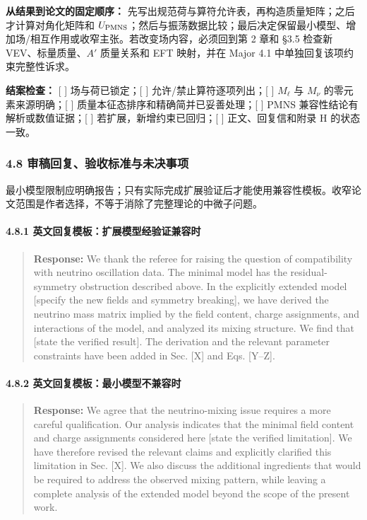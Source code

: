 \documentclass[
  chinese,
  UTF8]{ctexart}
\begin{document}
\textbf{从结果到论文的固定顺序：}
先写出规范荷与算符允许表，再构造质量矩阵；之后才计算对角化矩阵和
\(U_{\rm PMNS}\)；然后与振荡数据比较；最后决定保留最小模型、增加场/相互作用或收窄主张。若改变场内容，必须回到第
2 章和 §3.5 检查新 VEV、标量质量、\(A'\) 质量关系和 EFT 映射，并在 Major
4.1 中单独回复该项约束完整性诉求。

\textbf{结案检查：} {[} {]} 场与荷已锁定；{[} {]}
允许/禁止算符逐项列出；{[} {]} \(M_\ell\) 与 \(M_\nu\)
的零元素来源明确；{[} {]} 质量本征态排序和精确简并已妥善处理；{[} {]}
PMNS 兼容性结论有解析或数值证据；{[} {]} 若扩展，新增约束已回归；{[} {]}
正文、回复信和附录 H 的状态一致。

\subsubsection{4.8 审稿回复、验收标准与未决事项}\label{major-3-step-8}

最小模型限制应明确报告；只有实际完成扩展验证后才能使用兼容性模板。收窄论文范围是作者选择，不等于消除了完整理论的中微子问题。

\paragraph{4.8.1
英文回复模板：扩展模型经验证兼容时}\label{ux82f1ux6587ux56deux590dux6a21ux677fux6269ux5c55ux6a21ux578bux7ecfux9a8cux8bc1ux517cux5bb9ux65f6}

\begin{quote}
\textbf{Response:} We thank the referee for raising the question of
compatibility with neutrino oscillation data. The minimal model has the
residual-symmetry obstruction described above. In the explicitly
extended model {[}specify the new fields and symmetry breaking{]}, we
have derived the neutrino mass matrix implied by the field content,
charge assignments, and interactions of the model, and analyzed its
mixing structure. We find that {[}state the verified result{]}. The
derivation and the relevant parameter constraints have been added in
Sec. {[}X{]} and Eqs. {[}Y--Z{]}.
\end{quote}

\paragraph{4.8.2
英文回复模板：最小模型不兼容时}\label{ux82f1ux6587ux56deux590dux6a21ux677fux6700ux5c0fux6a21ux578bux4e0dux517cux5bb9ux65f6}

\begin{quote}
\textbf{Response:} We agree that the neutrino-mixing issue requires a
more careful qualification. Our analysis indicates that the minimal
field content and charge assignments considered here {[}state the
verified limitation{]}. We have therefore revised the relevant claims
and explicitly clarified this limitation in Sec. {[}X{]}. We also
discuss the additional ingredients that would be required to address the
observed mixing pattern, while leaving a complete analysis of the
extended model beyond the scope of the present work.
\end{quote}
\end{document}
